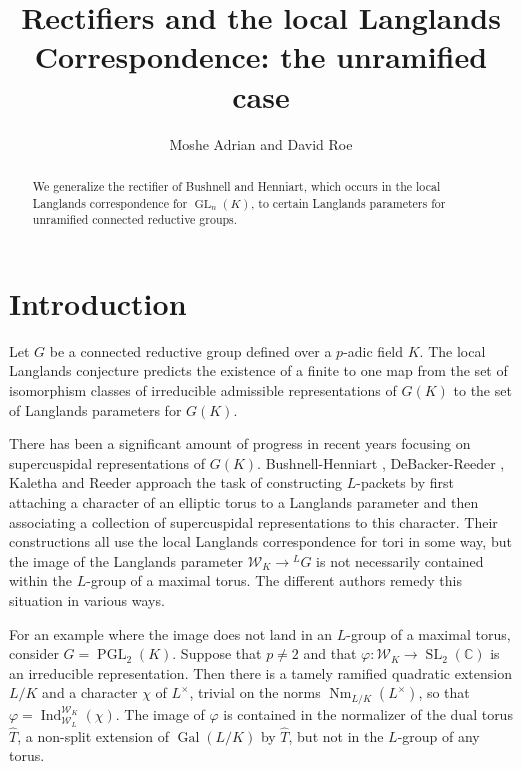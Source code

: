 \documentclass[11pt]{amsart}
\theoremstyle{plain}
\theoremstyle{definition}
\DeclareMathOperator{\Gal}{Gal}
\DeclareMathOperator{\Nm}{Nm}
\DeclareMathOperator{\Ind}{Ind}
\DeclareMathOperator{\GL}{GL}
\DeclareMathOperator{\PGL}{PGL}
\DeclareMathOperator{\SL}{SL}
\newcommand{\CC}{\mathbb{C}}
\newcommand{\Lx}{L^\times}
\newcommand{\Weil}{\mathcal{W}}
\begin{document}
\title[Rectifiers and the local Langlands Correspondence]{Rectifiers and the local Langlands Correspondence: the unramified case}
\author{Moshe Adrian and David Roe}



\begin{abstract}

We generalize the rectifier of Bushnell and Henniart,
which occurs in the local Langlands correspondence for
$\GL_{n}(K)$, to certain Langlands parameters for
unramified connected reductive groups.

\end{abstract}

\maketitle

\section{Introduction} \label{section:intro}

Let $G$ be a connected reductive group defined over a $p$-adic field $K$.
The local Langlands conjecture predicts the existence of a finite to one map
from the set of isomorphism classes of irreducible admissible representations
of $G(K)$ to the set of Langlands parameters for $G(K)$.

There has been a significant amount of progress in recent years
focusing on supercuspidal representations of $G(K)$.  Bushnell-Henniart \cite{bushnell-henniart:10a},
DeBacker-Reeder \cite{reeder-debacker:09a}, Kaletha \cite{kaletha:13a} and Reeder \cite{reeder:08a}
approach the task of constructing $L$-packets by first attaching
a character of an elliptic torus to a Langlands parameter and
then associating a collection of supercuspidal representations to this character.
Their constructions all use the local Langlands correspondence for tori in some way,
but the image of the Langlands parameter $\Weil_K \rightarrow {}^L G$ is not
necessarily contained within the $L$-group of a maximal torus.  The different authors
remedy this situation in various ways.

For an example where the image does not land in an $L$-group of a maximal torus,
consider $G = \PGL_{2}(K)$.  Suppose that $p \neq 2$ and that
$\varphi : \Weil_K \rightarrow \SL_{2}(\CC)$ is an
irreducible representation.  Then there is a tamely ramified quadratic
extension $L/K$ and a character
$\chi$ of $\Lx$, trivial on the norms $\Nm_{L/K}(\Lx)$, so that
$\varphi = \Ind_{\Weil_L}^{\Weil_K}(\chi)$.  The image of $\varphi$
is contained in the normalizer of the dual torus $\hat{T}$, a non-split
extension of $\Gal(L/K)$ by $\hat{T}$, but not in the $L$-group of any torus.
\end{document}
